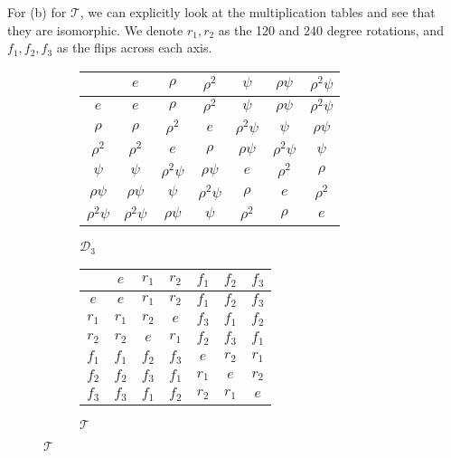 \begin{solution}
    For (b) for $\mathcal{T}$, we can explicitly look at the multiplication tables and see that they are isomorphic. We denote $r_1, r_2$ as the 120 and 240 degree rotations, and $f_1, f_2, f_3$ as the flips across each axis. 

    \begin{figure}[H]
      \centering
      \begin{subfigure}[b]{0.48\textwidth}
        \centering
        \begin{tabular}{c|cccccc}
          & $e$ & $\rho$ & $\rho^2$ & $\psi$ & $\rho\psi$ & $\rho^2\psi$ \\
          \hline
          $e$ & $e$ & $\rho$ & $\rho^2$ & $\psi$ & $\rho\psi$ & $\rho^2\psi$ \\
          $\rho$ & $\rho$ & $\rho^2$ & $e$ & $\rho^2\psi$ & $\psi$ & $\rho\psi$ \\
          $\rho^2$ & $\rho^2$ & $e$ & $\rho$ & $\rho\psi$ & $\rho^2\psi$ & $\psi$ \\
          $\psi$ & $\psi$ & $\rho^2\psi$ & $\rho\psi$ & $e$ & $\rho^2$ & $\rho$ \\
          $\rho\psi$ & $\rho\psi$ & $\psi$ & $\rho^2\psi$ & $\rho$ & $e$ & $\rho^2$ \\
          $\rho^2\psi$ & $\rho^2\psi$ & $\rho\psi$ & $\psi$ & $\rho^2$ & $\rho$ & $e$
        \end{tabular}
        \caption{$\mathcal{D}_3$}
      \end{subfigure}
      \hfill 
      \begin{subfigure}[b]{0.48\textwidth}
        \centering
        \begin{tabular}{c|cccccc}
          & $e$ & $r_1$ & $r_2$ & $f_1$ & $f_2$ & $f_3$ \\
          \hline
          $e$ & $e$ & $r_1$ & $r_2$ & $f_1$ & $f_2$ & $f_3$ \\
          $r_1$ & $r_1$ & $r_2$ & $e$ & $f_3$ & $f_1$ & $f_2$ \\
          $r_2$ & $r_2$ & $e$ & $r_1$ & $f_2$ & $f_3$ & $f_1$ \\
          $f_1$ & $f_1$ & $f_2$ & $f_3$ & $e$ & $r_2$ & $r_1$ \\
          $f_2$ & $f_2$ & $f_3$ & $f_1$ & $r_1$ & $e$ & $r_2$ \\
          $f_3$ & $f_3$ & $f_1$ & $f_2$ & $r_2$ & $r_1$ & $e$
        \end{tabular}
        \caption{$\mathcal{T}$}
      \end{subfigure}
    \end{figure}


\end{solution}

